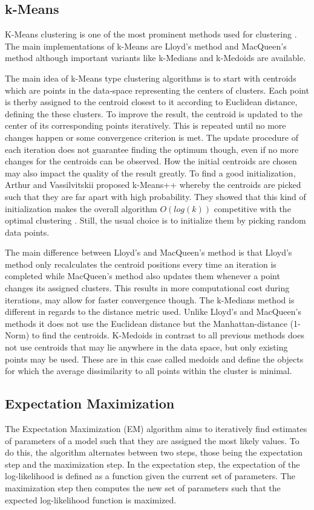 \documentclass[
	a4paper,
	english,
	twoside,
	openright,               
	11pt                            
	]{report}
\begin{document}
\subsection{k-Means}
K-Means clustering is one of the most prominent methods used for clustering \cite{Jin2010}. The main implementations of k-Means are Lloyd's method \cite{4031353} and MacQueen's method \cite{macqueen1967} although important variants like k-Medians \cite{Dohan2015KmedianAT} and k-Medoids \cite{kmedoids}  are available.

The main idea of k-Means type clustering algorithms is to start with centroids which are points in the data-space representing the centers of clusters. Each point is therby assigned to the centroid closest to it according to Euclidean distance, defining the these clusters. To improve the result, the centroid is updated to the center of its corresponding points iteratively. This is repeated until no more changes happen or some convergence criterion is met. The update procedure of each iteration does not guarantee finding the optimum though, even if no more changes for the centroids can be observed. How the initial centroids are chosen may also impact the quality of the result greatly. To find a good initialization, Arthur and Vassilvitskii \cite{10.5555/1283383.1283494} proposed k-Means++ whereby the centroids are picked such that they are far apart with high probability. They showed that this kind of initialization makes the overall algorithm $O(log(k))$ competitive with the optimal clustering \cite{10.5555/1283383.1283494}. Still, the usual choice is to initialize them by picking random data points.

The main difference between Lloyd's and MacQueen's method is that Lloyd's method only recalculates the centroid positions every time an iteration is completed while MacQueen's method also updates them whenever a point changes its assigned clusters. This results in more computational cost during iterations, may allow for faster convergence though. The k-Medians method is different in regards to the distance metric used. Unlike Lloyd's and MacQueen's methods it does not use the Euclidean distance but the Manhattan-distance (1-Norm) to find the centroids. K-Medoids in contrast to all previous methods does not use centroids that may lie anywhere in the data space, but only existing points may be used. These are in this case called medoids and define the objects for which the average dissimilarity to all points within the cluster is minimal.

\subsection{Expectation Maximization}
The Expectation Maximization (EM) algorithm \cite{10.2307/2984875} aims to iteratively find estimates of parameters of a model such that they are assigned the most likely values. To do this, the algorithm alternates between two steps, those being the expectation step and the maximization step. In the expectation step, the expectation of the log-likelihood is defined as a function given the current set of parameters. The maximization step then computes the new set of parameters such that the expected log-likelihood function is maximized.
\end{document}
